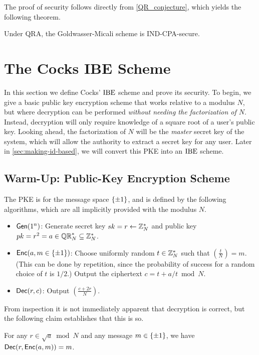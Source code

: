 \documentclass[11pt]{article}
\begin{document}
The proof of security follows directly from
\cref{QR_conjecture}, which yields the following theorem.

\begin{theorem}
  Under QRA, the Goldwasser-Micali scheme is IND-CPA-secure.
\end{theorem}

\section{The Cocks IBE Scheme}
\label{sec:cocks-scheme}

In this section we define Cocks' $\text{IBE}$ scheme and prove its security.
To begin, we give a basic public key encryption scheme that works
relative to a modulus $N$, but where decryption can be performed
\emph{without needing the factorization of $N$}.  Instead, decryption
will only require knowledge of a square root of a user's public key.
Looking ahead, the factorization of $N$ will be the \emph{master}
secret key of the system, which will allow the authority to extract a
secret key for any user.  Later in \cref{sec:making-id-based},
we will convert this PKE into an $\text{IBE}$ scheme.

\subsection{Warm-Up: Public-Key Encryption Scheme}
\label{sec:warm-up:-public}

The PKE is for the message space $\{\pm 1\}$, and is defined by the
following algorithms, which are all implicitly provided with the
modulus $N$.
\begin{itemize}
\item $\mathsf{Gen}(1^n)$: Generate secret key $sk = r \gets \mathbb{Z}_N^{*}$ and
  public key $pk = r^2 = a \in \mathbb{QR}_{N}^{*} \subseteq \mathbb{Z}_N^{*}$.
\item $\mathsf{Enc}(a, m \in \{\pm 1\})$: Choose uniformly random $t \in
  \mathbb{Z}_N^*$ such that $\left( \frac{t}{N}\right) = m$.  (This can be
  done by repetition, since the probability of success for a random
  choice of $t$ is $1/2$.)  Output the ciphertext $c = t + a/t \bmod
  N$.
\item $\mathsf{Dec}(r,c)$: Output $\left( \frac{c+2r}{N} \right)$.
\end{itemize}

From inspection it is not immediately apparent that decryption is
correct, but the following claim establishes that this is so.

\begin{claim}
  \label{dec_correct}
  For any $r \in \sqrt{a} \bmod N$ and any message $m \in \{\pm
    1\}$, we have $\mathsf{Dec}(r, \mathsf{Enc}(a, m)) = m$.
\end{claim}
\end{document}

